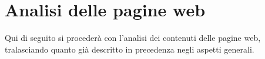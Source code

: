 \section{Analisi delle pagine web}
Qui di seguito si procederà con l'analisi dei contenuti delle pagine web,
tralasciando quanto gi\`a descritto in precedenza negli aspetti generali.

